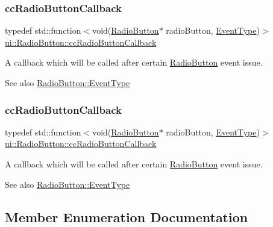 \subsubsection{\texorpdfstring{cc\+Radio\+Button\+Callback}{ccRadioButtonCallback}\hspace{0.1cm}{\footnotesize\ttfamily [1/2]}}
{\footnotesize\ttfamily typedef std\+::function$<$void(\hyperlink{classui_1_1RadioButton}{Radio\+Button}$\ast$ radio\+Button, \hyperlink{classui_1_1RadioButton_a1c4ce5b1a335b0cefe45808754818648}{Event\+Type})$>$ \hyperlink{classui_1_1RadioButton_a14dd0e15b76ab9ce823593a677cb777f}{ui\+::\+Radio\+Button\+::cc\+Radio\+Button\+Callback}}

A callback which will be called after certain \hyperlink{classui_1_1RadioButton}{Radio\+Button} event issue. \begin{DoxySeeAlso}{See also}
{\ttfamily \hyperlink{classui_1_1RadioButton_a1c4ce5b1a335b0cefe45808754818648}{Radio\+Button\+::\+Event\+Type}} 
\end{DoxySeeAlso}
\mbox{\label{classui_1_1RadioButton_a14dd0e15b76ab9ce823593a677cb777f}} 
\subsubsection{\texorpdfstring{cc\+Radio\+Button\+Callback}{ccRadioButtonCallback}\hspace{0.1cm}{\footnotesize\ttfamily [2/2]}}
{\footnotesize\ttfamily typedef std\+::function$<$void(\hyperlink{classui_1_1RadioButton}{Radio\+Button}$\ast$ radio\+Button, \hyperlink{classui_1_1RadioButton_a1c4ce5b1a335b0cefe45808754818648}{Event\+Type})$>$ \hyperlink{classui_1_1RadioButton_a14dd0e15b76ab9ce823593a677cb777f}{ui\+::\+Radio\+Button\+::cc\+Radio\+Button\+Callback}}

A callback which will be called after certain \hyperlink{classui_1_1RadioButton}{Radio\+Button} event issue. \begin{DoxySeeAlso}{See also}
{\ttfamily \hyperlink{classui_1_1RadioButton_a1c4ce5b1a335b0cefe45808754818648}{Radio\+Button\+::\+Event\+Type}} 
\end{DoxySeeAlso}


\subsection{Member Enumeration Documentation}
\mbox{\label{classui_1_1RadioButton_a1c4ce5b1a335b0cefe45808754818648}} 
